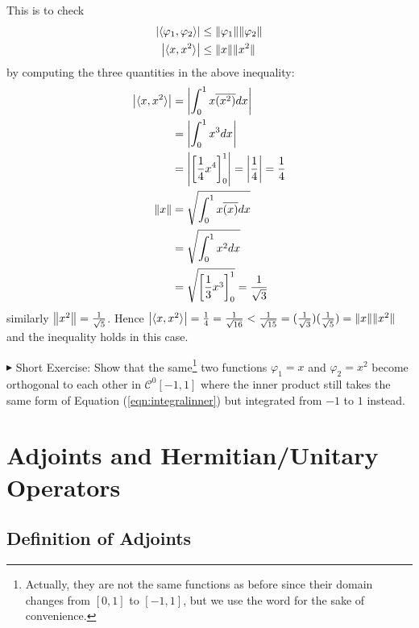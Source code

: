 \begin{solution}
This is to check 
\begin{align*}
\abs{\langle\varphi_1 , \varphi_2\rangle} &\leq \norm{\varphi_1}\norm{\varphi_2} \\
\abs{\langle x , x^2\rangle} &\leq \norm{x}\norm{\smash{x^2}}
\end{align*}
by computing the three quantities in the above inequality:
\begin{align*}
\abs{\langle x , x^2\rangle} &= \abs{\int_0^1 x \overline{(x^2)} dx} \\
&= \abs{\int_0^1 x^3 dx} \\
&= \abs{\left[\frac{1}{4}x^4\right]_0^1} = \abs{\frac{1}{4}} = \frac{1}{4} \\
\norm{x} &= \sqrt{\int_0^1 x \overline{(x)} dx} \\
&= \sqrt{\int_0^1 x^2 dx} \\
&= \sqrt{\left[\frac{1}{3}x^3\right]_0^1} = \frac{1}{\sqrt{3}}
\end{align*}
similarly $\norm{x^2} = \frac{1}{\sqrt{5}}$. Hence $\abs{\langle x , x^2\rangle} = \frac{1}{4} = \frac{1}{\sqrt{16}} < \frac{1}{\sqrt{15}} = (\frac{1}{\sqrt{3}})(\frac{1}{\sqrt{5}}) = \norm{x}\norm{\smash{x^2}}$ and the inequality holds in this case.
\end{solution}
$\blacktriangleright$ Short Exercise: Show that the same\footnote{Actually, they are not the same functions as before since their domain changes from $[0,1]$ to $[-1,1]$, but we use the word for the sake of convenience.} two functions $\varphi_1 = x$ and $\varphi_2 = x^2$ become orthogonal to each other in $\mathcal{C}^0[-1,1]$ where the inner product still takes the same form of Equation (\ref{eqn:integralinner}) but integrated from $-1$ to $1$ instead.\footnotemark

\section{Adjoints and Hermitian/Unitary Operators}
\label{section:adjointherm}

\subsection{Definition of Adjoints}
\label{section:adjointdef}


